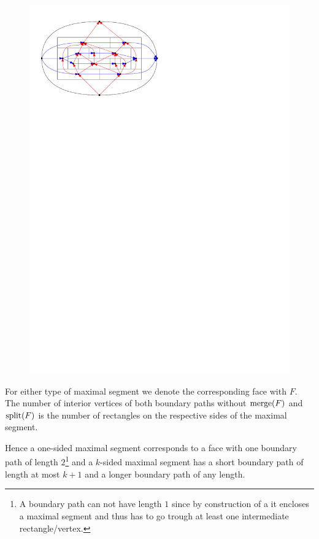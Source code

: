     \begin{figure}[h]
      \centering
      \includegraphics[scale=1]{rectangularDuals/img/relSegmentFaceRescale}
      \caption{}
      \label{fig:rect:relSegmentFace}
    \end{figure}

    For either type of maximal segment we denote the corresponding face with $F$. The number of interior vertices of both boundary paths without $\operatorname{merge}(F)$ and $\operatorname{split}(F)$ is the number of rectangles on the respective sides of the maximal segment.

    Hence a one-sided maximal segment corresponds to a face with one boundary path of length $2$\footnote{A boundary path can not have length $1$ since by construction of a \rel it encloses a maximal segment and thus has to go trough at least one intermediate rectangle/vertex.} and a $k$-sided maximal segment has a short boundary path of length at most $k+1$ and a longer boundary path of any length.

